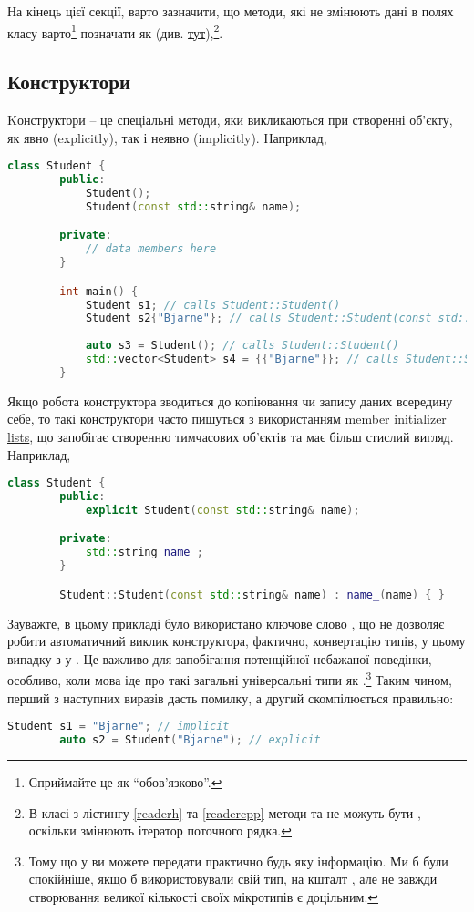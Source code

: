 \documentclass[12pt]{article}
\begin{document}
	На кінець цієї секції, варто зазначити, що методи, які не змінюють дані в полях класу варто\footnote{Сприймайте це як ``обов'язково''.} позначати як  (див. \href{https://en.cppreference.com/w/cpp/language/member_functions#const-_and_volatile-qualified_member_functions}{тут}),\footnote{В класі  з лістингу \ref{readerh} та \ref{readercpp} методи  та  не можуть бути , оскільки змінюють ітератор поточного рядка.}.
	
	\subsection{Конструктори}
	Kонструктори -- це спеціальні методи, яки викликаються при створенні об'єкту, як явно (explicitly), так і неявно (implicitly). Наприклад, 
	\begin{lstlisting}[language=c++]
		class Student {
		public:
			Student();
			Student(const std::string& name);

		private:
			// data members here
		}

		int main() {
			Student s1; // calls Student::Student()
			Student s2{"Bjarne"}; // calls Student::Student(const std::string& name)
			
			auto s3 = Student(); // calls Student::Student()
			std::vector<Student> s4 = {{"Bjarne"}}; // calls Student::Student(const std::string& name)
		}
	\end{lstlisting}
	Якщо робота конструктора зводиться до копіювання чи запису даних всередину себе, то такі конструктори часто пишуться з використанням \href{https://en.cppreference.com/w/cpp/language/constructor}{member initializer lists}, що запобігає створенню тимчасових об'єктів та має більш стислий вигляд. Наприклад,
	\begin{lstlisting}[language=c++]
		class Student {
		public:
			explicit Student(const std::string& name);

		private:
			std::string name_;
		}

		Student::Student(const std::string& name) : name_(name) { }
	\end{lstlisting}
	Зауважте, в цьому прикладі було використано ключове слово \href{https://en.cppreference.com/w/cpp/language/explicit}{}, що не дозволяє робити автоматичний виклик конструктора, фактично, конвертацію типів, у цьому випадку з  у . Це важливо для запобігання потенційної небажаної поведінки, особливо, коли мова іде про такі загальні універсальні типи як .\footnote{Тому що у  ви можете передати практично будь яку інформацію. Ми б були спокійніше, якщо б використовували свій тип, на кшталт , але не завжди створювання великої кількості своїх мікротипів є доцільним.} Таким чином, перший з наступних виразів дасть помилку, а другий скомпілюється правильно:
	\begin{lstlisting}[language=c++]
		Student s1 = "Bjarne"; // implicit
		auto s2 = Student("Bjarne"); // explicit
	\end{lstlisting}
\end{document}
